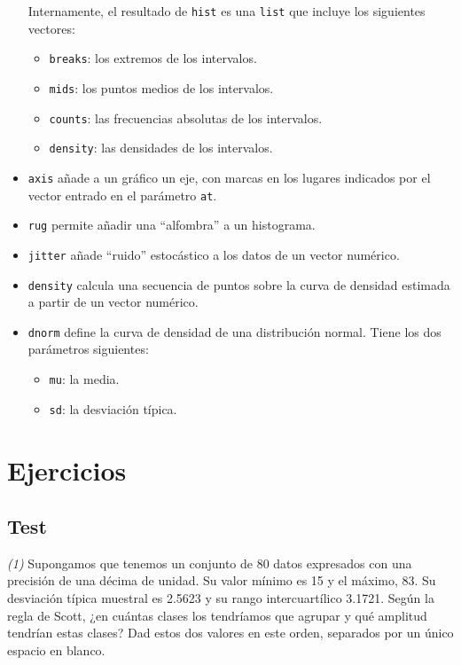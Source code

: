 \documentclass[
]{book}
\providecommand{\tightlist}{%
  \setlength{\itemsep}{0pt}\setlength{\parskip}{0pt}}
\theoremstyle{definition}
\theoremstyle{definition}
\theoremstyle{definition}
\theoremstyle{remark}
\begin{document}
\begin{itemize}
  Internamente, el resultado de \texttt{hist} es una \texttt{list} que incluye los siguientes vectores:

  \begin{itemize}
  \item
    \texttt{breaks}: los extremos de los intervalos.
  \item
    \texttt{mids}: los puntos medios de los intervalos.
  \item
    \texttt{counts}: las frecuencias absolutas de los intervalos.
  \item
    \texttt{density}: las densidades de los intervalos.
  \end{itemize}
\item
  \texttt{axis} añade a un gráfico un eje, con marcas en los lugares indicados por el vector entrado en el parámetro \texttt{at}.
\item
  \texttt{rug} permite añadir una ``alfombra'' a un histograma.
\item
  \texttt{jitter} añade ``ruido'' estocástico a los datos de un vector numérico.
\item
  \texttt{density} calcula una secuencia de puntos sobre la curva de densidad estimada a partir de un vector numérico.
\item
  \texttt{dnorm} define la curva de densidad de una distribución normal. Tiene los dos parámetros siguientes:

  \begin{itemize}
  \tightlist
  \item
    \texttt{mu}: la media.
  \item
    \texttt{sd}: la desviación típica.
  \end{itemize}
\end{itemize}

\hypertarget{ejercicios-11}{%
\section{Ejercicios}\label{ejercicios-11}}

\hypertarget{test-10}{%
\subsection*{Test}\label{test-10}}

\emph{(1)} Supongamos que tenemos un conjunto de 80 datos expresados con una precisión de una décima de unidad. Su valor mínimo es 15 y el máximo, 83. Su desviación típica muestral es 2.5623 y su rango intercuartílico 3.1721. Según la regla de Scott, ¿en cuántas clases los tendríamos que agrupar y qué amplitud tendrían estas clases? Dad estos dos valores en este orden, separados por un único espacio en blanco.
\end{document}
